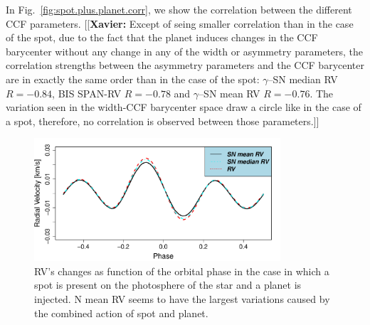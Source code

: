 \documentclass{aa}
\newcommand{\xavier}[1]{{\color{blue}[[\textbf{Xavier: }#1]]}}
\begin{document}
In Fig.~\ref{fig:spot.plus.planet.corr}, we show the correlation between the different CCF parameters. \xavier{Except of seing smaller correlation than in the case of the spot, due to the fact that the planet induces changes in the CCF barycenter without any change in any of the width or asymmetry parameters, the correlation strengths between the asymmetry parameters and the CCF barycenter are in exactly the same order than in the case of the spot: $\gamma$--SN median RV $R=-0.84$, BIS SPAN-RV $R=-0.78$ and $\gamma$--SN mean RV $R=-0.76$. The variation seen in the width-CCF barycenter space draw a circle like in the case of a spot, therefore, no correlation is observed between those parameters.}

\begin{figure}[htbp]
   \centering
\includegraphics[width = 3.6in]{RV_comparison_SPOT_PLANET.pdf} 
 \caption{RV's changes as function of the orbital phase in the case in which a spot is present on the photosphere of the star and a planet is injected. N mean RV seems to have the largest variations caused by the combined action of spot and planet.}
    \label{fig:spot.plus.planet}
\end{figure}
\end{document}
